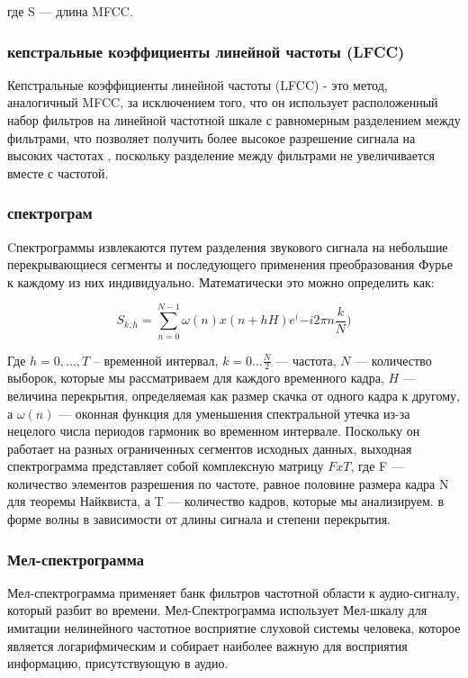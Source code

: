 где S — длина MFCC. 

\subsubsection{кепстральные коэффициенты линейной частоты (LFCC)}

Кепстральные коэффициенты линейной частоты (LFCC) - это метод, аналогичный MFCC, за исключением того, что он использует расположенный набор фильтров на линейной частотной шкале с равномерным разделением между фильтрами, что позволяет получить более высокое разрешение сигнала на высоких частотах \cite{lfcc-00}, поскольку разделение между фильтрами не увеличивается вместе с частотой.

\subsubsection{спектрограм}

Cпектрограммы извлекаются путем разделения звукового сигнала на небольшие перекрывающиеся сегменты и последующего применения преобразования Фурье к каждому из них индивидуально.
Математически это можно определить как:

\begin{equation}
    S_{k,h} = \sum_{n=0}^{N - 1} \omega (n) x(n + hH)e^({-i2\pi n \frac{k}{N})}
\end{equation}

Где \(h = 0, \ldots , T\) – временной интервал, \(k = 0 \ldots \frac{N}{2}\) — частота, \(N\) — количество выборок, которые мы рассматриваем для каждого временного кадра, \(H\) — величина перекрытия, определяемая как размер скачка от одного кадра к другому, а \(\omega(n)\) — оконная функция для уменьшения спектральной утечка из-за нецелого числа периодов гармоник во временном интервале. Поскольку он работает на разных ограниченных сегментов исходных данных, выходная спектрограмма представляет собой комплексную матрицу \(FxT\), где F — количество элементов разрешения по частоте, равное половине размера кадра N для теоремы Найквиста, а T — количество кадров, которые мы анализируем. в форме волны в зависимости от длины сигнала и степени перекрытия.

\subsubsection{Мел-спектрограмма}

Мел-спектрограмма применяет банк фильтров частотной области к аудио-сигналу, который разбит во времени. Мел-Спектрограмма  использует Мел-шкалу для имитации нелинейного частотное восприятие слуховой системы человека, которое является логарифмическим и собирает наиболее важную для восприятия информацию, присутствующую в аудио.

